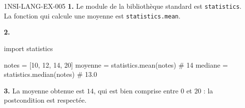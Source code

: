 \begin{corrige}{1NSI-LANG-EX-005}
\textbf{1.} Le module de la bibliothèque standard est \lstinline{statistics}. La fonction
qui calcule une moyenne est \lstinline{statistics.mean}.

\textbf{2.}
\begin{python}
import statistics

notes = [10, 12, 14, 20]
moyenne = statistics.mean(notes)     # 14
mediane = statistics.median(notes)   # 13.0
\end{python}

\textbf{3.} La moyenne obtenue est $14$, qui est bien comprise entre $0$ et $20$ : la
postcondition est respectée.
\end{corrige}
